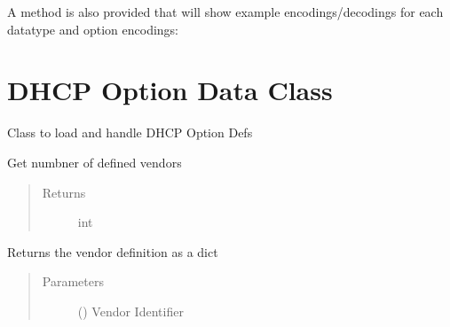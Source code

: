 \documentclass[letterpaper,10pt,english]{sphinxmanual}
\begin{document}
\sphinxAtStartPar
A  method is also provided that will show example
encodings/decodings for each data\sphinxhyphen{}type and option encodings:


\section{DHCP Option Data Class}
\label{\detokenize{dhcp-option-data-class:dhcp-option-data-class}}\label{\detokenize{dhcp-option-data-class::doc}}

\begin{fulllineitems}
\label{\detokenize{dhcp-option-data-class:bloxone.DHCP_OPTION_DEFS}}
\sphinxAtStartPar
Class to load and handle DHCP Option Defs

\begin{fulllineitems}
\label{\detokenize{dhcp-option-data-class:bloxone.DHCP_OPTION_DEFS.count}}
\sphinxAtStartPar
Get numbner of defined vendors
\begin{quote}\begin{description}
\item[{Returns}] \leavevmode
\sphinxAtStartPar
int

\end{description}\end{quote}

\end{fulllineitems}


\begin{fulllineitems}
\label{\detokenize{dhcp-option-data-class:bloxone.DHCP_OPTION_DEFS.dump_vendor_def}}
\sphinxAtStartPar
Returns the vendor definition as a dict
\begin{quote}\begin{description}
\item[{Parameters}] \leavevmode
\sphinxAtStartPar
{} () \textendash{} Vendor Identifier


\end{description}
\end{quote}
\end{fulllineitems}
\end{fulllineitems}
\end{document}
